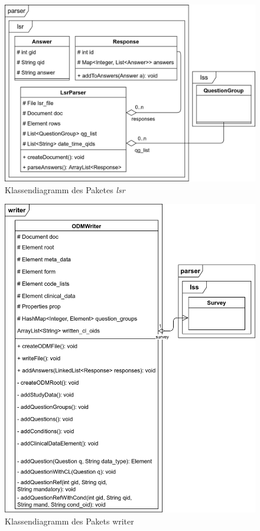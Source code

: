 \begin{figure}[h]
			\centering
			\includegraphics[width=.98\textwidth]{./img/cls_lsr.png}
			\caption{Klassendiagramm des Paketes \textit{lsr}}
\end{figure}

\begin{figure}[h]
	\centering
	\includegraphics[width=.98\textwidth]{./img/cls_writer.png}
	\caption{Klassendiagramm des Pakets writer}
\end{figure}

